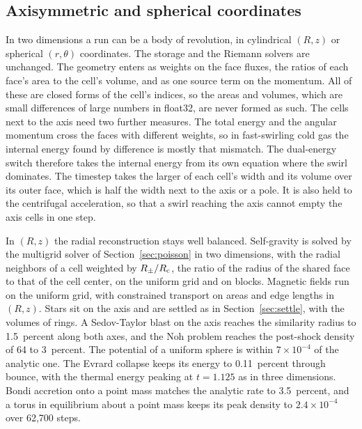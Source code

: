 \documentclass[twocolumn]{aastex701}
\begin{document}
\subsection{Axisymmetric and spherical coordinates}
\label{sec:curvilinear}

In two dimensions a run can be a body of revolution, in cylindrical $(R, z)$ or spherical $(r, \theta)$ coordinates. The storage and the Riemann solvers are unchanged. The geometry enters as weights on the face fluxes, the ratios of each face's area to the cell's volume, and as one source term on the momentum. All of these are closed forms of the cell's indices, so the areas and volumes, which are small differences of large numbers in float32, are never formed as such. The cells next to the axis need two further measures. The total energy and the angular momentum cross the faces with different weights, so in fast-swirling cold gas the internal energy found by difference is mostly that mismatch. The dual-energy switch therefore takes the internal energy from its own equation where the swirl dominates. The timestep takes the larger of each cell's width and its volume over its outer face, which is half the width next to the axis or a pole. It is also held to the centrifugal acceleration, so that a swirl reaching the axis cannot empty the axis cells in one step.

In $(R, z)$ the radial reconstruction stays well balanced. Self-gravity is solved by the multigrid solver of Section~\ref{sec:poisson} in two dimensions, with the radial neighbors of a cell weighted by $R_\pm/R_{\rm c}$, the ratio of the radius of the shared face to that of the cell center, on the uniform grid and on blocks. Magnetic fields run on the uniform grid, with constrained transport on areas and edge lengths in $(R, z)$. Stars sit on the axis and are settled as in Section~\ref{sec:settle}, with the volumes of rings. A Sedov-Taylor blast on the axis reaches the similarity radius to 1.5~percent along both axes, and the Noh problem reaches the post-shock density of 64 to 3~percent. The potential of a uniform sphere is within $7\times10^{-4}$ of the analytic one. The Evrard collapse keeps its energy to 0.11~percent through bounce, with the thermal energy peaking at $t = 1.125$ as in three dimensions. Bondi accretion onto a point mass matches the analytic rate to 3.5~percent, and a torus in equilibrium about a point mass keeps its peak density to $2.4\times10^{-4}$ over 62,700 steps.
\end{document}
